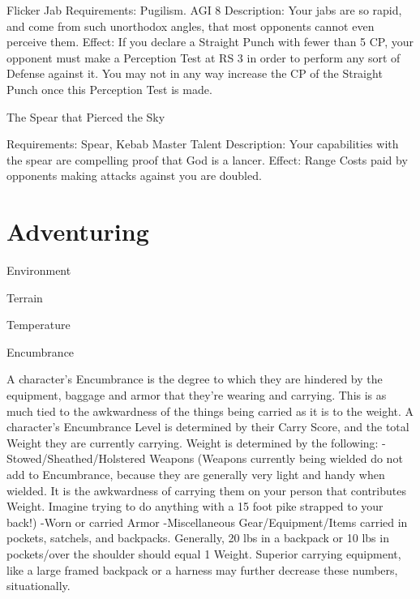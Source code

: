 \documentclass[oneside,11pt,english]{book}
\begin{document}
 

Flicker Jab 
Requirements: Pugilism. AGI 8 
Description: Your jabs are so rapid, and come from such unorthodox angles, that most opponents cannot 
even perceive them. 
Effect: If you declare a Straight Punch with fewer than 5 CP, your opponent must make a Perception Test 
at RS 3 in order to perform any sort of Defense against it. You may not in any way increase the CP of the 
Straight Punch once this Perception Test is made. 

 

The Spear that Pierced the Sky 


Requirements: Spear, Kebab Master Talent 
Description: Your capabilities with the spear are compelling proof that God is a lancer. 
Effect: Range Costs paid by opponents making attacks against you are doubled. 

 

\chapter{Adventuring}\label{ch:adventuring}
\startcontents[chapters]
\clearpage

Environment 

 

Terrain 

 

Temperature 

 

Encumbrance 

 

A character’s Encumbrance is the degree to which they are hindered by the equipment, baggage and 
armor that they’re wearing and carrying. This is as much tied to the awkwardness of the things being 
carried as it is to the weight. 
A character’s Encumbrance Level is determined by their Carry Score, and the total Weight they are 
currently carrying. Weight is determined by the following: 
-Stowed/Sheathed/Holstered Weapons (Weapons currently being wielded do not add to Encumbrance, 
because they are generally very light and handy when wielded. It is the awkwardness of carrying them on 
your person that contributes Weight. Imagine trying to do anything with a 15 foot pike strapped to your 
back!) 
-Worn or carried Armor 
-Miscellaneous Gear/Equipment/Items carried in pockets, satchels, and backpacks. Generally, 20 lbs in 
a backpack or 10 lbs in pockets/over the shoulder should equal 1 Weight. Superior carrying equipment, 
like a large framed backpack or a harness may further decrease these numbers, situationally. 
\end{document}
